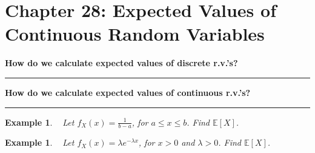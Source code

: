 \documentclass[12pt]{amsart}
\newtheorem{example}[theorem]{Example}
\newcommand\Ebb{\mathbb{E}}
\newcommand\gl{\lambda}
\newcommand\pdfX{f_X(x)}
\begin{document}
\setcounter{section}{28}
{\huge  
\section*{Chapter 28: Expected Values \newline of Continuous Random Variables}
}

{\large %




\vspace{.5cm}


\textbf{How do we calculate expected values of discrete r.v.'s?}

\vspace{5cm}
\hrule
\vspace{.5cm}



\textbf{How do we calculate expected values of continuous r.v.'s?}

\vspace{5cm}
\hrule
\vspace{.5cm}


\begin{example}\label{28_E_Uab}\ \newline
Let $\pdfX = \frac{1}{b-a}$, for $a \leq x \leq b$. Find $\Ebb[X]$.

\end{example}

\newpage
\begin{example}\label{28_E_Exp}\ \newline
Let $\pdfX = \gl e^{-\gl x}$, for $x > 0$ and $\gl > 0$. Find $\Ebb[X]$.


\end{example}}
\end{document}
